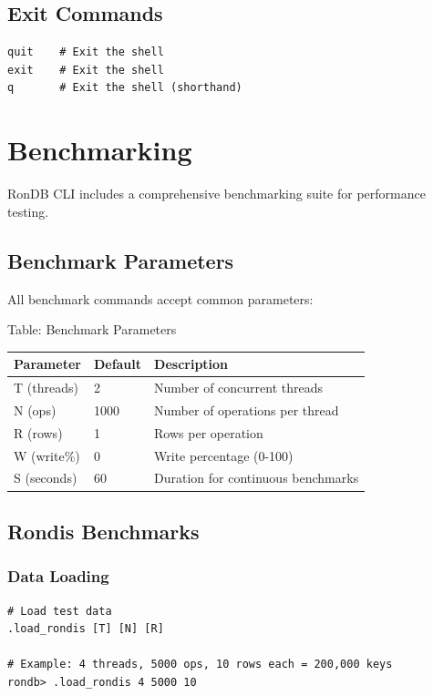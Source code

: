 \documentclass[11pt,a4paper]{report}
\begin{document}
\section{Exit Commands}

\begin{lstlisting}[language=rondb]
quit    # Exit the shell
exit    # Exit the shell
q       # Exit the shell (shorthand)
\end{lstlisting}

\chapter{Benchmarking}

RonDB CLI includes a comprehensive benchmarking suite for performance testing.

\section{Benchmark Parameters}

All benchmark commands accept common parameters:

Table: Benchmark Parameters

\begin{tabular}{lll}
\toprule
Parameter & Default & Description \\
\midrule
T (threads) & 2 & Number of concurrent threads \\
N (ops) & 1000 & Number of operations per thread \\
R (rows) & 1 & Rows per operation \\
W (write\%) & 0 & Write percentage (0-100) \\
S (seconds) & 60 & Duration for continuous benchmarks \\
\bottomrule
\end{tabular}

\section{Rondis Benchmarks}

\subsection{Data Loading}

\begin{lstlisting}[language=rondb]
# Load test data
.load_rondis [T] [N] [R]

# Example: 4 threads, 5000 ops, 10 rows each = 200,000 keys
rondb> .load_rondis 4 5000 10
\end{lstlisting}
\end{document}
